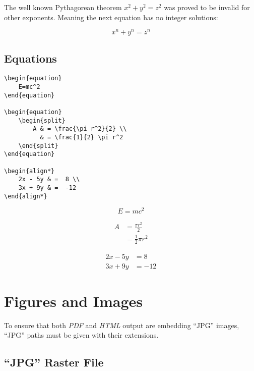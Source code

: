 The well known Pythagorean theorem \(x^2 + y^2 = z^2\) was
proved to be invalid for other exponents.
Meaning the next equation has no integer solutions:

\[x^n + y^n = z^n\]

\subsection*{Equations}

\begin{lstlisting}[caption={Equations.}]
\begin{equation}
    E=mc^2
\end{equation}

\begin{equation}
    \begin{split}
        A & = \frac{\pi r^2}{2} \\
          & = \frac{1}{2} \pi r^2
    \end{split}
\end{equation}

\begin{align*}
    2x - 5y & =  8 \\
    3x + 9y & =  -12
\end{align*}
\end{lstlisting}

\begin{equation}
    E=mc^2
\end{equation}

\begin{equation}
    \begin{split}
        A & = \frac{\pi r^2}{2} \\
          & = \frac{1}{2} \pi r^2
    \end{split}
\end{equation}

\begin{align*}
    2x - 5y & =  8 \\
    3x + 9y & =  -12
\end{align*}

\section*{Figures and Images}

To ensure that both \textit{PDF} and \textit{HTML} output are embedding
``JPG'' images, ``JPG'' paths must be given with their extensions.

\subsection*{``JPG'' Raster File}

